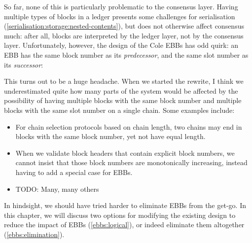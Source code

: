 So far, none of this is particularly problematic to the consensus layer. Having
multiple types of blocks in a ledger presents some challenges for serialisation
(\cref{serialisation:storage:nested-contents}), but does not otherwise affect
consensus much: after all, blocks are interpreted by the ledger layer, not by
the consensus layer. Unfortunately, however, the design of the Cole EBBs has
odd quirk: an EBB has the same block number as its \emph{predecessor}, and the
same slot number as its \emph{successor}:
%
\begin{center}
\end{center}
%
This turns out to be a huge headache. When we started the rewrite, I think we
underestimated quite how many parts of the system would be affected by the
possibility of having multiple blocks with the same block number and
multiple blocks with the same slot number on a single chain. Some examples
include:

\begin{itemize}
\item \label{ebb-chain-selection}
For chain selection protocols based on chain length, two chains may end in
blocks with the same block number, yet not have equal length.

\item When we validate block headers that contain explicit block numbers, we
cannot insist that those block numbers are monotonically increasing, instead
having to add a special case for EBBs.

\item TODO: Many, many others
\end{itemize}

In hindsight, we should have tried harder to eliminate EBBs from the get-go. In
this chapter, we will discuss two options for modifying the existing design to
reduce the impact of EBBs (\cref{ebbs:logical}), or indeed eliminate them
altogether (\cref{ebbs:elimination}).

